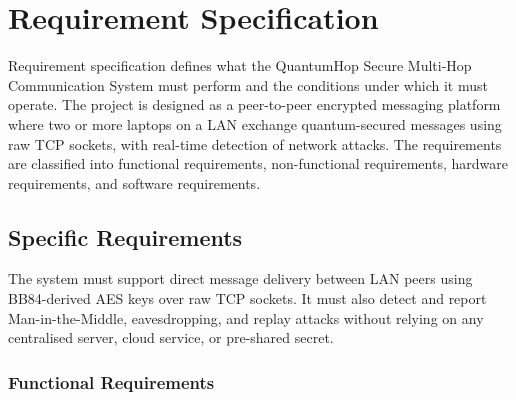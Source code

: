\chapter{Requirement Specification}

Requirement specification defines what the QuantumHop Secure Multi-Hop Communication System must perform and the conditions under which it must operate. The project is designed as a peer-to-peer encrypted messaging platform where two or more laptops on a LAN exchange quantum-secured messages using raw TCP sockets, with real-time detection of network attacks. The requirements are classified into functional requirements, non-functional requirements, hardware requirements, and software requirements.

\section{Specific Requirements}

The system must support direct message delivery between LAN peers using BB84-derived AES keys over raw TCP sockets. It must also detect and report Man-in-the-Middle, eavesdropping, and replay attacks without relying on any centralised server, cloud service, or pre-shared secret.

\subsection{Functional Requirements}

